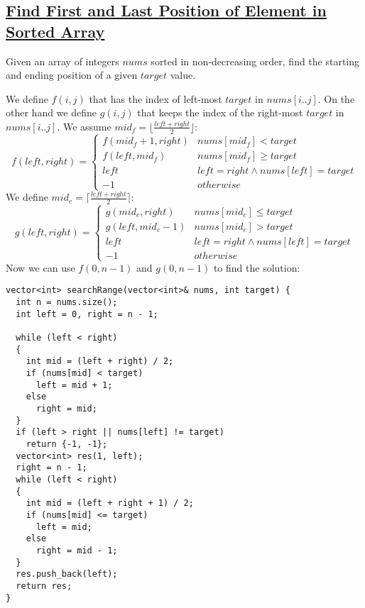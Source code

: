 \documentclass{book}
\begin{document}
	\subsection{\href{https://leetcode.com/problems/find-first-and-last-position-of-element-in-sorted-array/}{Find First and Last Position of Element in Sorted Array}}
	Given an array of integers $nums$ sorted in non-decreasing order, find the starting and ending position of a given $target$ value.
	\par We define $f(i, j)$ that has the index of left-most $target$ in $nums[i..j]$. On the other hand we define $g(i, j)$ that keeps the index of the right-most $target$ in $nums[i..j]$. We assume $mid_f = \lfloor \frac{left + right}{2} \rfloor$:
	\begin{equation*}
		f(left, right) = \begin{cases}
			f(mid_f + 1, right) & nums[mid_f] < target \\
			f(left, mid_f) & nums[mid_f] \ge target \\
			left & left = right \land nums[left] = target \\
			-1 & otherwise
		\end{cases}
	\end{equation*}
	We define $mid_c = \lceil \frac{left + right}{2} \rceil$:
	\begin{equation*}
		g(left, right) = \begin{cases}
			g(mid_c, right) & nums[mid_c] \le target \\
			g(left, mid_c - 1) & nums[mid_c] > target \\
			left & left = right \land nums[left] = target \\
			-1 & otherwise
		\end{cases}
	\end{equation*}
	Now we can use $f(0, n - 1)$ and $g(0, n - 1)$ to find the solution:
	\begin{lstlisting}
vector<int> searchRange(vector<int>& nums, int target) {
  int n = nums.size();
  int left = 0, right = n - 1;
  
  while (left < right)
  {
    int mid = (left + right) / 2;
    if (nums[mid] < target)
      left = mid + 1;
    else
      right = mid;
  }
  if (left > right || nums[left] != target)
    return {-1, -1};
  vector<int> res(1, left);
  right = n - 1;
  while (left < right)
  {
    int mid = (left + right + 1) / 2;
    if (nums[mid] <= target)
      left = mid;
    else
      right = mid - 1;
  }
  res.push_back(left);
  return res;
}
	\end{lstlisting}
\end{document}

